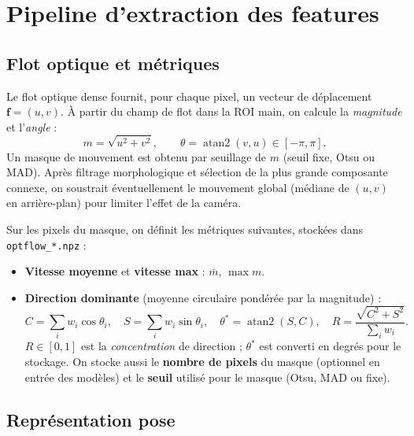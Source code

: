 \documentclass[11pt,a4paper]{article}
\begin{document}
\section{Pipeline d’extraction des features}
\label{sec:pipeline}

\subsection{Flot optique et métriques}

Le flot optique dense fournit, pour chaque pixel, un vecteur de déplacement $\mathbf{f} = (u, v)$. À partir du champ de flot dans la ROI main, on calcule la \emph{magnitude} et l’\emph{angle} :
\begin{equation}
  m = \sqrt{u^2 + v^2}, \qquad \theta = \operatorname{atan2}(v, u) \in [-\pi, \pi].
\end{equation}
Un masque de mouvement est obtenu par seuillage de $m$ (seuil fixe, Otsu ou MAD). Après filtrage morphologique et sélection de la plus grande composante connexe, on soustrait éventuellement le mouvement global (médiane de $(u,v)$ en arrière-plan) pour limiter l’effet de la caméra.

Sur les pixels du masque, on définit les métriques suivantes, stockées dans \texttt{optflow\_*.npz} :
\begin{itemize}
  \item \textbf{Vitesse moyenne} et \textbf{vitesse max} : $\bar{m}$, $\max m$.
  \item \textbf{Direction dominante} (moyenne circulaire pondérée par la magnitude) :
  \begin{equation}
    C = \sum_i w_i \cos\theta_i, \quad S = \sum_i w_i \sin\theta_i, \quad \theta^* = \operatorname{atan2}(S, C), \quad R = \frac{\sqrt{C^2+S^2}}{\sum_i w_i}.
  \end{equation}
  $R \in [0,1]$ est la \emph{concentration} de direction ; $\theta^*$ est converti en degrés pour le stockage. On stocke aussi le \textbf{nombre de pixels} du masque (optionnel en entrée des modèles) et le \textbf{seuil} utilisé pour le masque (Otsu, MAD ou fixe).
\end{itemize}

\subsection{Représentation pose}
\end{document}
